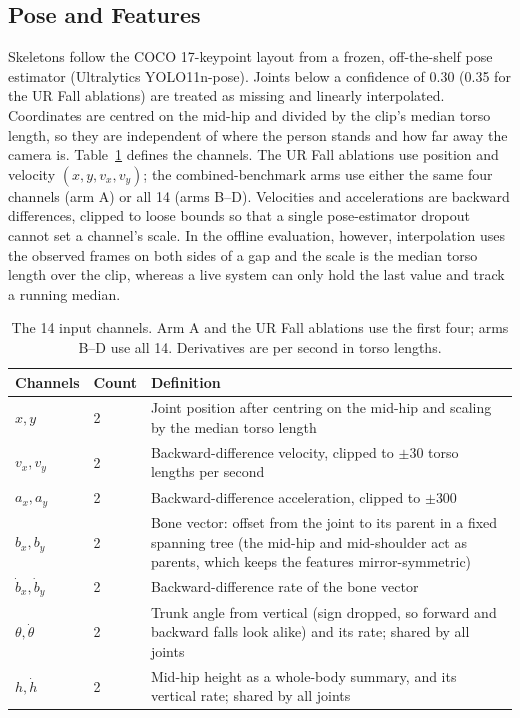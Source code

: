 \documentclass[journal]{IEEEtran}
\begin{document}
\subsection{Pose and Features}\label{sub:pose}

Skeletons follow the COCO 17-keypoint layout from a frozen, off-the-shelf pose estimator (Ultralytics YOLO11n-pose). Joints below a confidence of 0.30 (0.35 for the UR Fall ablations) are treated as missing and linearly interpolated. Coordinates are centred on the mid-hip and divided by the clip's median torso length, so they are independent of where the person stands and how far away the camera is. Table~\ref{tab:features} defines the channels. The UR Fall ablations use position and velocity $(x, y, v_x, v_y)$; the combined-benchmark arms use either the same four channels (arm A) or all 14 (arms B--D). Velocities and accelerations are backward differences, clipped to loose bounds so that a single pose-estimator dropout cannot set a channel's scale. In the offline evaluation, however, interpolation uses the observed frames on both sides of a gap and the scale is the median torso length over the clip, whereas a live system can only hold the last value and track a running median.

\begin{table}[!t]
\renewcommand{\arraystretch}{1.15}
\caption{The 14 input channels. Arm A and the UR Fall ablations use the first four; arms B--D use all 14. Derivatives are per second in torso lengths.}
\label{tab:features}
\centering
\footnotesize
\begin{tabular}{p{}p{}p{}}
\hline
Channels & Count & Definition \\
\hline
$x, y$ & 2 & Joint position after centring on the mid-hip and scaling by the median torso length \\
$v_x, v_y$ & 2 & Backward-difference velocity, clipped to $\pm$30 torso lengths per second \\
$a_x, a_y$ & 2 & Backward-difference acceleration, clipped to $\pm$300 \\
$b_x, b_y$ & 2 & Bone vector: offset from the joint to its parent in a fixed spanning tree (the mid-hip and mid-shoulder act as parents, which keeps the features mirror-symmetric) \\
$\dot b_x, \dot b_y$ & 2 & Backward-difference rate of the bone vector \\
$\theta, \dot\theta$ & 2 & Trunk angle from vertical (sign dropped, so forward and backward falls look alike) and its rate; shared by all joints \\
$h, \dot h$ & 2 & Mid-hip height as a whole-body summary, and its vertical rate; shared by all joints \\
\hline
\end{tabular}
\end{table}
\end{document}
